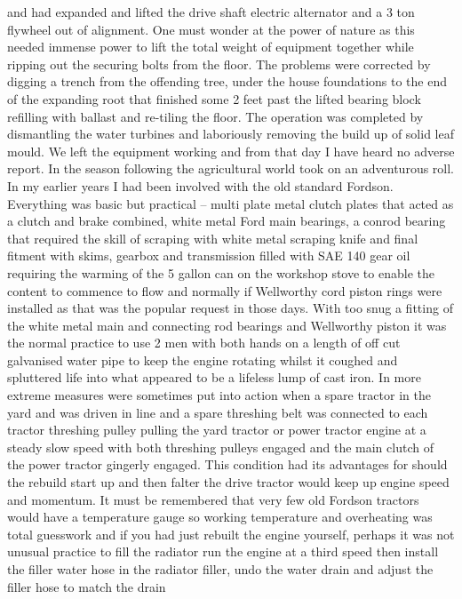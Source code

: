 and had expanded and lifted the drive shaft electric alternator and a 3 ton
flywheel out of alignment.  One must wonder at the power of nature as this
needed immense power to lift the total weight of equipment together while
ripping out the securing bolts from the floor.  The problems were corrected by
digging a trench from the offending tree, under the house foundations to the
end of the expanding root that finished some 2 feet past the lifted bearing
block refilling with ballast and re-tiling the floor.  The operation was
completed by dismantling the water turbines and laboriously removing the build
up of solid leaf mould.  We left the equipment working and from that day I have
heard no adverse report. In the season following the agricultural world took on
an adventurous roll.  In my earlier years I had been involved with the old
standard Fordson.  Everything was basic but practical – multi plate metal
clutch plates that acted as a clutch and brake combined, white metal Ford main
bearings, a conrod bearing that required the skill of scraping with white metal
scraping knife and final fitment with skims, gearbox and transmission filled
with SAE 140 gear oil requiring the warming of the 5 gallon can on the workshop
stove to enable the content to commence to flow and normally if Wellworthy cord
piston rings were installed as that was the popular request in those days. With
too snug a fitting of the white metal main and connecting rod bearings and
Wellworthy piston it was the normal practice to use 2 men with both hands on a
length of off cut galvanised water pipe to keep the engine rotating whilst it
coughed and spluttered life into what appeared to be a lifeless lump of cast
iron. In more extreme measures were sometimes put into action when a spare
tractor in the yard and was driven in line and a spare threshing belt was
connected to each tractor threshing pulley pulling the yard tractor or power
tractor engine at a steady slow speed with both threshing pulleys engaged and
the main clutch of the power tractor gingerly engaged. This condition had its
advantages for should the rebuild start up and then falter the drive tractor
would keep up engine speed and momentum.  It must be remembered that very few
old Fordson tractors would have a temperature gauge so working temperature and
overheating was total guesswork and if you had just rebuilt the engine
yourself, perhaps it was not unusual practice to fill the radiator run the
engine at a third speed then install the filler water hose in the radiator
filler, undo the water drain and adjust the filler hose to match the drain
